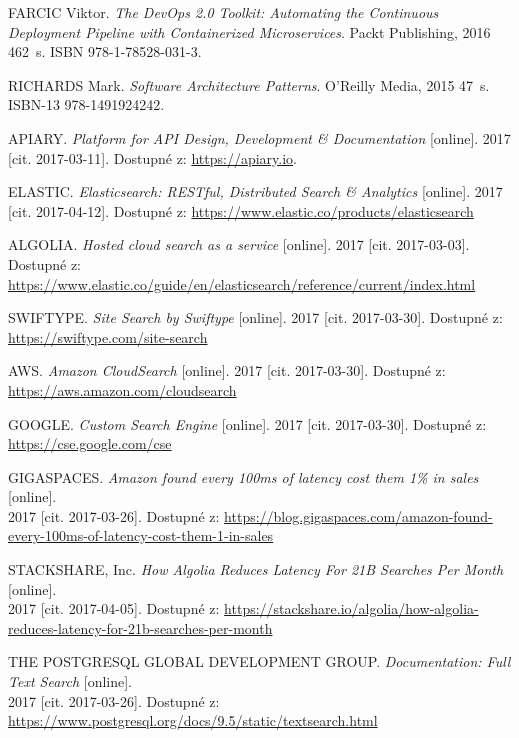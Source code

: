 \documentclass[FM,DP]{tulthesis}
\begin{document}
\begin{thebibliography}{Mm99}
 FARCIC Viktor. \emph{The DevOps 2.0 Toolkit: Automating the Continuous Deployment Pipeline 
with Containerized Microservices}. Packt Publishing, 2016 462~s. ISBN 978-1-78528-031-3.

 RICHARDS Mark. \emph{Software Architecture Patterns}.
O'Reilly Media, 2015 47~s. ISBN-13 978-1491924242.


 APIARY. \emph{Platform for API Design, Development \& Documentation} [online].
2017 [cit. 2017-03-11]. Dostupné z: \url{https://apiary.io}.

 ELASTIC. \emph{ Elasticsearch: RESTful, Distributed Search \& Analytics} [online].
2017 [cit. 2017-04-12]. Dostupné z: \url{https://www.elastic.co/products/elasticsearch}

 ALGOLIA. \emph{Hosted cloud search as a service} [online].
2017 [cit. 2017-03-03]. Dostupné z:
\url{https://www.elastic.co/guide/en/elasticsearch/reference/current/index.html}

 SWIFTYPE. \emph{Site Search by Swiftype} [online].
2017 [cit. 2017-03-30]. Dostupné z: \url{https://swiftype.com/site-search}

 AWS. \emph{Amazon CloudSearch} [online].
2017 [cit. 2017-03-30]. Dostupné z: \url{https://aws.amazon.com/cloudsearch}

 GOOGLE. \emph{Custom Search Engine} [online].
2017 [cit. 2017-03-30]. Dostupné z: \url{https://cse.google.com/cse}

 GIGASPACES.
\emph{Amazon found every 100ms of latency cost them 1\% in sales} [online]. \\
2017 [cit. 2017-03-26].
Dostupné z: \url{https://blog.gigaspaces.com/amazon-found-every-100ms-of-latency-cost-them-1-in-sales}

 STACKSHARE, Inc. 
\emph{How Algolia Reduces Latency For 21B Searches Per Month} [online].\\
2017 [cit. 2017-04-05]. Dostupné z:
\url{https://stackshare.io/algolia/how-algolia-reduces-latency-for-21b-searches-per-month}

 THE POSTGRESQL GLOBAL DEVELOPMENT GROUP. \emph{Documentation: Full Text Search} [online].\\
2017 [cit. 2017-03-26]. Dostupné z: \url{https://www.postgresql.org/docs/9.5/static/textsearch.html}


\end{thebibliography}
\end{document}
